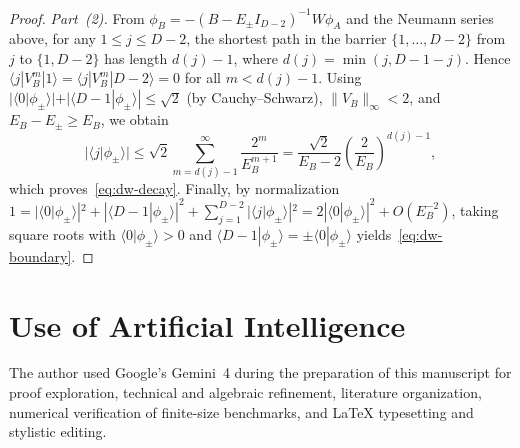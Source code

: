 \documentclass[11pt,a4paper]{article}
\numberwithin{equation}{section}
\theoremstyle{plain}
\theoremstyle{definition}
\begin{document}
\begin{proof}
\emph{Part~(2).} From $\phi_B = -(B - E_\pm I_{D-2})^{-1} W\phi_A$ and the Neumann series above, for any $1\le j\le D-2$, the shortest path in the barrier $\{1,\dots,D-2\}$ from $j$ to $\{1, D-2\}$ has length $d(j)-1$, where $d(j) = \min(j, D-1-j)$. Hence $\langle j|V_B^m|1\rangle = \langle j|V_B^m|D-2\rangle = 0$ for all $m < d(j)-1$. Using $|\langle 0|\phi_\pm\rangle| + |\langle D-1|\phi_\pm\rangle| \le \sqrt{2}$ (by Cauchy--Schwarz), $\|V_B\|_\infty < 2$, and $E_B - E_\pm \ge E_B$, we obtain
\[
  \bigl|\langle j|\phi_\pm\rangle\bigr|
  \le \sqrt{2}\sum_{m=d(j)-1}^\infty \frac{2^m}{E_B^{m+1}}
   = \frac{\sqrt{2}}{E_B - 2}\left(\frac{2}{E_B}\right)^{d(j)-1},
\]
which proves~\eqref{eq:dw-decay}. Finally, by normalization $1 = |\langle 0|\phi_\pm\rangle|^2 + |\langle D-1|\phi_\pm\rangle|^2 + \sum_{j=1}^{D-2}|\langle j|\phi_\pm\rangle|^2 = 2|\langle 0|\phi_\pm\rangle|^2 + O(E_B^{-2})$, taking square roots with $\langle 0|\phi_\pm\rangle > 0$ and $\langle D-1|\phi_\pm\rangle = \pm\langle 0|\phi_\pm\rangle$ yields~\eqref{eq:dw-boundary}.
\end{proof}

\section*{Use of Artificial Intelligence}

The author used Google's Gemini~4 during the preparation of this manuscript for proof exploration, technical and algebraic refinement, literature organization, numerical verification of finite-size benchmarks, and \LaTeX{} typesetting and stylistic editing.
\end{document}
